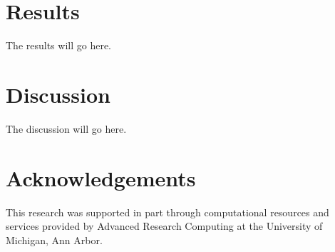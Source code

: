 \documentclass[12pt]{article}
\begin{document}
\section*{Results}

The results will go here.


\section*{Discussion}

The discussion will go here.


\section*{Acknowledgements}

This research was supported in part through computational resources
and services provided by Advanced Research Computing
at the University of Michigan, Ann Arbor.



\end{document}
